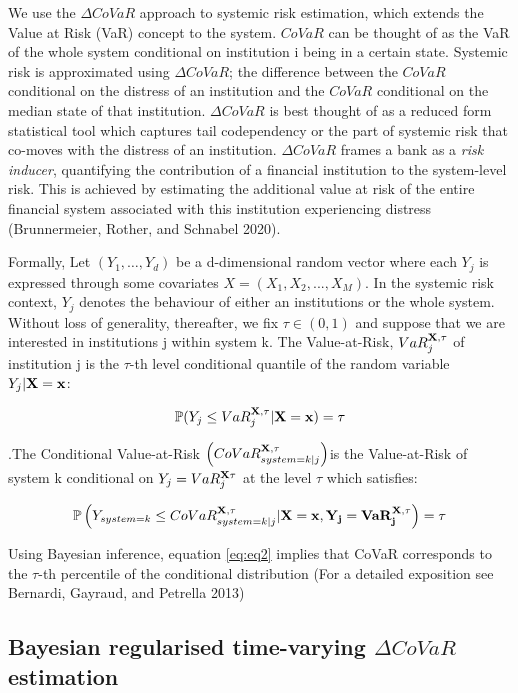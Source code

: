 \documentclass[
  10pt,
]{article}
\begin{document}
We use the \(\Delta CoVaR\) approach to systemic risk estimation, which
extends the Value at Risk (VaR) concept to the system. \(CoVaR\) can be
thought of as the VaR of the whole system conditional on institution i
being in a certain state. Systemic risk is approximated using
\(\Delta CoVaR\); the difference between the \(CoVaR\) conditional on
the distress of an institution and the \(CoVaR\) conditional on the
median state of that institution. \(\Delta CoVaR\) is best thought of as
a reduced form statistical tool which captures tail codependency or the
part of systemic risk that co-moves with the distress of an institution.
\(\Delta CoVaR\) frames a bank as a \emph{risk inducer}, quantifying the
contribution of a financial institution to the system-level risk. This
is achieved by estimating the additional value at risk of the entire
financial system associated with this institution experiencing distress
(Brunnermeier, Rother, and Schnabel 2020).

Formally, Let \((Y_1,\dots,Y_d)\) be a d-dimensional random vector where
each \(Y_j\) is expressed through some covariates
\(X= (X_1,X_2,...,X_M)\). In the systemic risk context, \(Y_j\) denotes
the behaviour of either an institutions or the whole system. Without
loss of generality, thereafter, we fix \(\tau \in (0,1)\) and suppose
that we are interested in institutions j within system k. The
Value-at-Risk, \(VaR^{\bf{X},\tau}_j\) of institution j is the
\(\tau\)-th level conditional quantile of the random variable
\(Y_j|\bf{X}=x\):

\begin{equation}\label{eq:eq1}
\mathbb{P}(Y_j \leq VaR^{\bf{X},\tau}_j |\bf{X}=x)=\tau
\end{equation}

.The Conditional Value-at-Risk
\(\left( CoVaR_{system=k|j}^{\bf{X},\tau} \right)\)is the Value-at-Risk
of system k conditional on \(Y_j= VaR_j^{\bf{X}\tau}\) at the level
\(\tau\) which satisfies:

\begin{equation}\label{eq:eq2}
\mathbb{P}\left(Y_{system=k} \leq CoVaR_{system=k|j}^{\bf{X},\tau} |\bf{X}=x,Y_j=VaR^{\bf{X},\tau}_j \right)=\tau
\end{equation}

Using Bayesian inference, equation \ref{eq:eq2} implies that CoVaR
corresponds to the \(\tau\)-th percentile of the conditional
distribution (For a detailed exposition see Bernardi, Gayraud, and
Petrella 2013)

\hypertarget{bayesian-regularised-time-varying-delta-covar-estimation}{%
\subsection{\texorpdfstring{Bayesian regularised time-varying
\(\Delta CoVaR\)
estimation}{Bayesian regularised time-varying \textbackslash Delta CoVaR estimation}}\label{bayesian-regularised-time-varying-delta-covar-estimation}}
\end{document}
